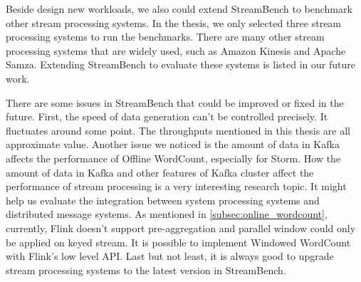Beside design new workloads, we also could extend StreamBench to benchmark other stream processing systems. In the thesis, we only selected three stream processing systems to run the benchmarks. There are many other stream processing systems that are widely used, such as Amazon Kinesis and Apache Samza. Extending StreamBench to evaluate these systems is listed in our future work.

There are some issues in StreamBench that could be improved or fixed in the future. First, the speed of data generation can't be controlled precisely. It fluctuates around some point. The throughputs mentioned in this thesis are all approximate value. Another issue we noticed is the amount of data in Kafka affects the performance of Offline WordCount, especially for Storm. How the amount of data in Kafka and other features of Kafka cluster affect the performance of stream processing is a very interesting research topic. It might help us evaluate the integration between system processing systems and distributed message systems. As mentioned in \cref{subsec:online_wordcount}, currently, Flink doesn't support pre-aggregation and parallel window could only be applied on keyed stream. It is possible to implement Windowed WordCount with Flink's low level API. Last but not least, it is always good to upgrade stream processing systems to the latest version in StreamBench. 

\clearpage


